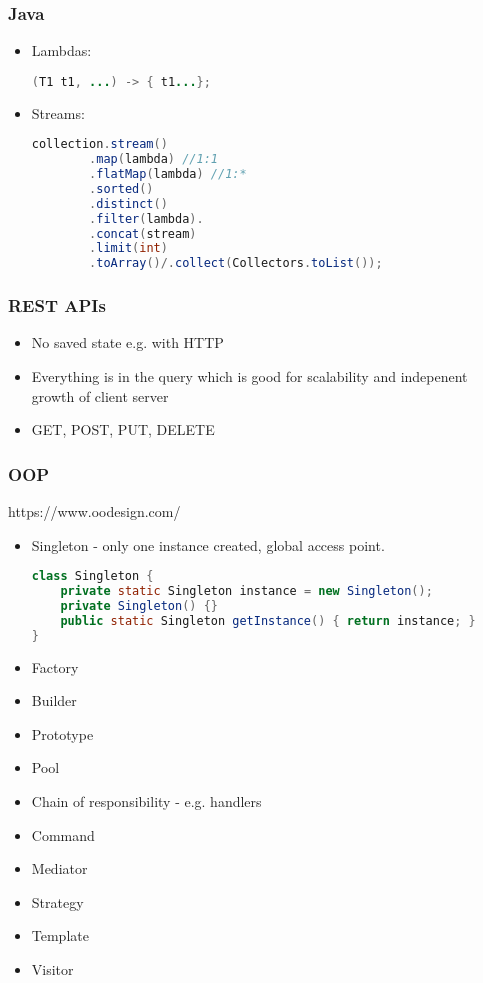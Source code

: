 \documentclass{article}
\begin{document}
\subsubsection{Java}
\begin{itemize}
    \item Lambdas:
    \begin{lstlisting}[language=java]
    (T1 t1, ...) -> { t1...};
    \end{lstlisting}
    \item Streams:
    \begin{lstlisting}[language=java]
    collection.stream()
        .map(lambda) //1:1
        .flatMap(lambda) //1:*
        .sorted()
        .distinct()
        .filter(lambda).
        .concat(stream)
        .limit(int)
        .toArray()/.collect(Collectors.toList());
    \end{lstlisting}
\end{itemize}

\subsubsection{REST APIs}
\begin{itemize}
    \item No saved state e.g. with HTTP
    \item Everything is in the query which is good for scalability and indepenent growth of client server
    \item GET, POST, PUT, DELETE
\end{itemize}

\subsubsection{OOP}
https://www.oodesign.com/
\begin{itemize}
    \item Singleton - only one instance created, global access point.
\begin{lstlisting}[language=java]
class Singleton {
    private static Singleton instance = new Singleton();
    private Singleton() {}
    public static Singleton getInstance() { return instance; }
}
\end{lstlisting}
    \item Factory
    \item Builder
    \item Prototype
    \item Pool
    \item Chain of responsibility - e.g. handlers
    \item Command
    \item Mediator
    \item Strategy
    \item Template
    \item Visitor
\end{itemize}
\end{document}
